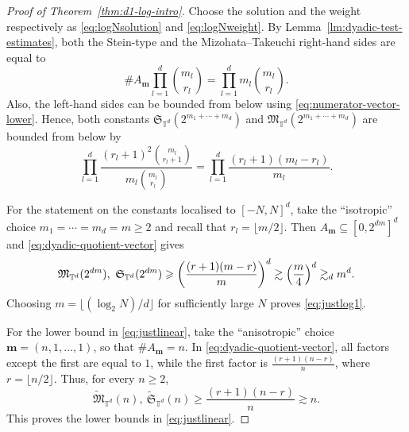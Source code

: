 \documentclass[11pt,reqno]{amsart}
\numberwithin{equation}{section}
\renewcommand{\geq}{\geqslant}
\renewcommand{\ge}{\geqslant}
\begin{document}
\begin{proof}[Proof of Theorem~\ref{thm:d1-log-intro}]
Choose the solution and the weight respectively as \eqref{eq:logNsolution} and \eqref{eq:logNweight}.
By Lemma~\ref{lm:dyadic-test-estimates}, both the Stein-type and the Mizohata--Takeuchi right-hand sides are equal to
\[ \#A_{\mathbf{m}}\prod_{l=1}^d\binom{m_l}{r_l} = \prod_{l=1}^d m_l\binom{m_l}{r_l}. \]
Also, the left-hand sides can be bounded from below using \eqref{eq:numerator-vector-lower}. Hence, both constants $\mathfrak{S}_{\mathbb{T}^d}(2^{m_{1}+\cdots+m_{d}})$ and $\mathfrak{M}_{\mathbb{T}^d}(2^{m_{1}+\cdots+m_{d}})$ are bounded from below by
\begin{equation}\label{eq:dyadic-quotient-vector}
\prod_{l=1}^d \frac{(r_l+1)^2\binom{m_l}{r_l+1}}{m_l\binom{m_l}{r_l}} = \prod_{l=1}^d \frac{(r_l+1)(m_l-r_l)}{m_l}.
\end{equation}

For the statement on the constants localised to $[-N,N]^d$, take the ``isotropic'' choice $m_1=\cdots=m_d=m\geq2$ and recall that $r_l=\lfloor m/2\rfloor$. Then $A_{\mathbf{m}}\subseteq[0,2^{dm}]^d$ and \eqref{eq:dyadic-quotient-vector} gives
\[ \mathfrak{M}_{\mathbb{T}^d}(2^{dm}),\ \mathfrak{S}_{\mathbb{T}^d}(2^{dm}) \ge \biggl(\frac{(r+1)(m-r)}{m}\biggr)^d \gtrsim \Bigl(\frac{m}{4}\Bigr)^d \gtrsim_d m^d. \]
Choosing $m =\lfloor (\log_2 N)/d \rfloor$ for sufficiently large $N$ proves \eqref{eq:justlog1}.

For the lower bound in \eqref{eq:justlinear}, take the ``anisotropic'' choice $\mathbf{m}=(n,1,\ldots,1)$, so that $\#A_{\mathbf{m}}=n$. In \eqref{eq:dyadic-quotient-vector}, all factors except the first are equal to $1$, while the first factor is $\frac{(r+1)(n-r)}{n}$, where $r=\lfloor n/2\rfloor$.
Thus, for every $n\ge2$,
\[ \widetilde{\mathfrak{M}}_{\mathbb{T}^d}(n),\ \widetilde{\mathfrak{S}}_{\mathbb{T}^d}(n) \ge \frac{(r+1)(n-r)}{n} \gtrsim n. \]
This proves the lower bounds in \eqref{eq:justlinear}. 


\end{proof}
\end{document}
